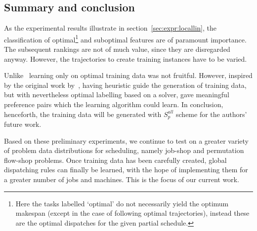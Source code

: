 \documentclass{svjour3}                     %
\begin{document}

\subsection{Summary and conclusion}
As the experimental results illustrate in section~\ref{sec:expr:locallin}, the classification of optimal\footnote{Here the tasks labelled `optimal' do not necessarily yield the optimum makespan (except in the case of following optimal trajectories), instead these are the optimal dispatches for the given partial schedule.} and suboptimal features are of paramount importance. The subsequent rankings are not of much value, since they are disregarded anyway. However, the trajectories to create training instances have to be varied.

Unlike~\cite{Siggi10,Malik08,Russell09} learning only on optimal training data was not fruitful. However, inspired by the original work by~\cite{Siggi05}, having heuristic guide the generation of training data, but with nevertheless optimal labelling based on a solver, gave meaningful preference pairs which the learning algorithm could learn. In conclusion, henceforth, the training data will be generated with $S_{p}^{all}$ scheme for the authors' future work.

Based on these preliminary experiments, we continue to test on a greater variety of problem data distributions for scheduling, namely job-shop and permutation flow-shop problems. Once training data has been carefully created, global dispatching rules can finally be learned, with the hope of implementing them for a greater number of jobs and machines. This is the focus of our current work.



\end{document}
